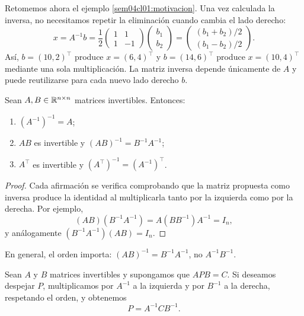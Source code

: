 \documentclass[compacto,10pt]{pubciencias-notas}
\begin{document}
Retomemos ahora el ejemplo \ref{sem04cl01:motivacion}. Una vez calculada la
inversa, no necesitamos repetir la eliminación cuando cambia el lado derecho:
\[
    x=A^{-1}b
    =\frac12\begin{pmatrix}1&1\\1&-1\end{pmatrix}
     \begin{pmatrix}b_1\\b_2\end{pmatrix}
    =\begin{pmatrix}(b_1+b_2)/2\\(b_1-b_2)/2\end{pmatrix}.
\]
Así, $b=(10,2)^{\top}$ produce $x=(6,4)^{\top}$ y
$b=(14,6)^{\top}$ produce $x=(10,4)^{\top}$ mediante una sola multiplicación.
La matriz inversa depende únicamente de $A$ y puede reutilizarse para cada
nuevo lado derecho $b$.

\begin{prop}\label{sem04cl01:prop-inversa}
    Sean $A,B\in\Mat[\R]{n}{n}$ matrices invertibles. Entonces:
    \begin{enumerate}
        \item $(A^{-1})^{-1}=A$;
        \item $AB$ es invertible y $(AB)^{-1}=B^{-1}A^{-1}$;
        \item $A^{\top}$ es invertible y
              $(A^{\top})^{-1}=(A^{-1})^{\top}$.
    \end{enumerate}
\end{prop}

\begin{proof}
    Cada afirmación se verifica comprobando que la matriz propuesta como
    inversa produce la identidad al multiplicarla tanto por la izquierda como
    por la derecha. Por ejemplo,
    \[
        (AB)(B^{-1}A^{-1})
        =A(BB^{-1})A^{-1}=I_n,
    \]
    y análogamente $(B^{-1}A^{-1})(AB)=I_n$.
\end{proof}

\begin{advertencia}
    En general, el orden importa: $(AB)^{-1}=B^{-1}A^{-1}$, no
    $A^{-1}B^{-1}$.
\end{advertencia}

\begin{ejem}
    Sean $A$ y $B$ matrices invertibles y supongamos que $APB=C$. Si deseamos
    despejar $P$, multiplicamos por $A^{-1}$ a la izquierda y por $B^{-1}$ a
    la derecha, respetando el orden, y obtenemos
    \[
        P=A^{-1}CB^{-1}.
    \]
\end{ejem}
\end{document}
